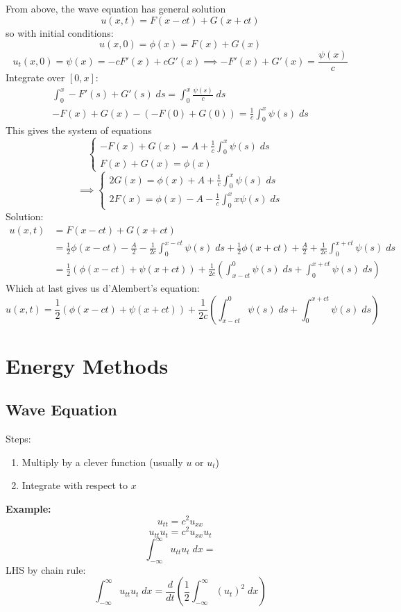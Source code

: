 \documentclass[12pt]{article}
\begin{document}
From above, the wave equation has general solution 
\[u(x, t) = F(x - ct) + G(x + ct)\]
so with initial conditions:
\[u(x, 0) = \phi(x) = F(x) + G(x)\]
\[u_t(x, 0)= \psi(x) = -cF'(x) + cG'(x) \implies -F'(x) + G'(x) = \frac{\psi(x)}{c}\]
Integrate over $[0, x]$:
\begin{gather*}
    \int_0^x -F'(s) + G'(s) \; ds = \int_0^x \frac{\psi(s)}{c}\; ds\\
    -F(x) + G(x) -(-F(0) + G(0)) = \frac{1}{c}\int_0^x \psi(s)\; ds
\end{gather*}
This gives the system of equations 
\[\begin{cases}
    -F(x) + G(x) = A + \frac{1}{c}\int_0^x \psi(s)\; ds\\
    F(x) + G(x) = \phi(x)
\end{cases}\]
\[\implies \begin{cases*}
    2G(x) = \phi(x) + A + \frac{1}{c}\int_0^x \psi(s)\; ds\\
    2F(x) = \phi(x) - A - \frac{1}{c}\int_0^xx \psi(s)\;ds
\end{cases*}\]
Solution:
\begin{align*}
    u(x, t) &= F(x - ct) + G(x+ct)\\
    &= \frac{1}{2}\phi(x - ct) - \frac{A}{2} - \frac{1}{2c}\int_0^{x - ct} \psi(s)\; ds + \frac{1}{2}\phi(x + ct) + \frac{A}{2} + \frac{1}{2c}\int_0^{x+ct}\psi(s)\;ds\\
    &= \frac{1}{2}(\phi(x -ct) + \psi(x + ct)) + \frac{1}{2c}\left(\int_{x-ct}^0 \psi(s)\;ds + \int_0^{x+ ct} \psi(s)\; ds\right)
\end{align*}
Which at last gives us d'Alembert's equation:
\[\boxed{u(x, t) = \frac{1}{2}(\phi(x -ct) + \psi(x + ct)) + \frac{1}{2c}\left(\int_{x-ct}^0 \psi(s)\;ds + \int_0^{x+ ct} \psi(s)\; ds\right)}\]

\section{Energy Methods}
\subsection{Wave Equation}
Steps:
\begin{enumerate}
    \item Multiply by a clever function (usually $u$ or $u_t$)
    \item Integrate with respect to $x$
\end{enumerate}

\textbf{Example:}
\[u_{tt} = c^2 u_{xx}\]
\[u_{tt}u_t = c^2 u_{xx} u_t\]
\[\int_{-\infty}^{\infty} u_{tt} u_t \; dx =\]
LHS by chain rule:
\[\int_{-\infty}^{\infty} u_{tt} u_t \; dx = \frac{d}{dt}\left(\frac{1}{2}\int_{-\infty}^{\infty} (u_t)^2 \; dx\right)\]
\end{document}

